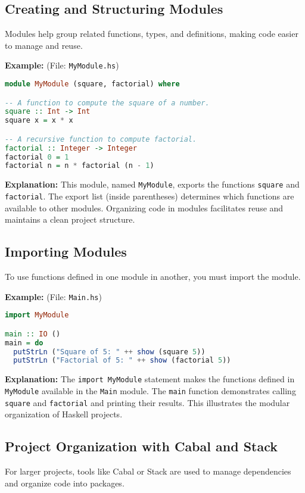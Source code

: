 \documentclass[11pt,a4paper]{article}
\begin{document}
\subsection{Creating and Structuring Modules}
Modules help group related functions, types, and definitions, making code easier to manage and reuse.

\textbf{Example:} (File: \texttt{MyModule.hs})
\begin{lstlisting}[language=Haskell]
module MyModule (square, factorial) where

-- A function to compute the square of a number.
square :: Int -> Int
square x = x * x

-- A recursive function to compute factorial.
factorial :: Integer -> Integer
factorial 0 = 1
factorial n = n * factorial (n - 1)
\end{lstlisting}

\textbf{Explanation:}  
This module, named \texttt{MyModule}, exports the functions \texttt{square} and \texttt{factorial}. The export list (inside parentheses) determines which functions are available to other modules. Organizing code in modules facilitates reuse and maintains a clean project structure.

\subsection{Importing Modules}
To use functions defined in one module in another, you must import the module.

\textbf{Example:} (File: \texttt{Main.hs})
\begin{lstlisting}[language=Haskell]
import MyModule

main :: IO ()
main = do
  putStrLn ("Square of 5: " ++ show (square 5))
  putStrLn ("Factorial of 5: " ++ show (factorial 5))
\end{lstlisting}

\textbf{Explanation:}  
The \texttt{import MyModule} statement makes the functions defined in \texttt{MyModule} available in the \texttt{Main} module. The \texttt{main} function demonstrates calling \texttt{square} and \texttt{factorial} and printing their results. This illustrates the modular organization of Haskell projects.

\subsection{Project Organization with Cabal and Stack}
For larger projects, tools like Cabal or Stack are used to manage dependencies and organize code into packages.
\end{document}
